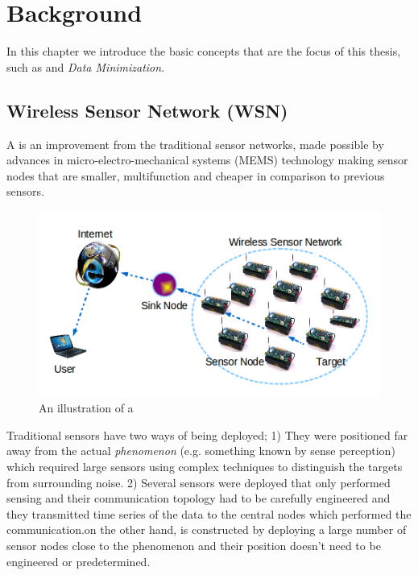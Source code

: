 \chapter{Background}

In this chapter we introduce the basic concepts that are the focus of this thesis, such as \wsns and \textit{Data Minimization}. %


\section{Wireless Sensor Network (WSN)}



A \wsn is an improvement from the traditional sensor networks, made possible by advances in micro-electro-mechanical systems (MEMS) technology making sensor nodes that are smaller, multifunction and cheaper in comparison to previous sensors. 

\begin{figure}[ht]
    \includegraphics{include/figures/WSN_illu}
    \caption{An illustration of a \wsn}
    \label{fig:wsn_illustration}
\end{figure}

Traditional sensors have two ways of being deployed; 1) They were positioned far away from the actual \textit{phenomenon} (e.g. something known by sense perception) which required large sensors using complex techniques to distinguish the targets from surrounding noise. 2) Several sensors were deployed that only performed sensing and their communication topology had to be carefully engineered and they transmitted time series of the data to the central nodes which performed the communication.\wsns on the other hand, is constructed by deploying a large number of sensor nodes close to the phenomenon and their position doesn't need to be engineered or predetermined.\cite{wsnsurvey} 

